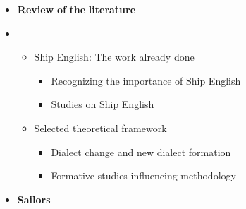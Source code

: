 \begin{itemize}
\item \begin{styleNormali}
\textbf{Review} \textbf{of} \textbf{the} \textbf{literature} 
\end{styleNormali}
\end{itemize}

\setcounter{itemize}{1}
\begin{itemize}
\item \begin{itemize}
\item \begin{styleNormali}
Ship English: The work already done
\end{styleNormali}

\begin{itemize}
\item \begin{styleNormali}
Recognizing the importance of Ship English 
\end{styleNormali}
\item \begin{styleNormali}
Studies on Ship English
\end{styleNormali}
\end{itemize}
\item \begin{styleNormali}
Selected theoretical framework 
\end{styleNormali}

\begin{itemize}
\item \begin{styleNormali}
Dialect change and new dialect formation 
\end{styleNormali}
\item \begin{styleNormali}
Formative studies influencing methodology
\end{styleNormali}
\end{itemize}
\end{itemize}
\end{itemize}

\begin{itemize}
\item \begin{styleNormali}
\textbf{Sailors} 
\end{styleNormali}
\end{itemize}

